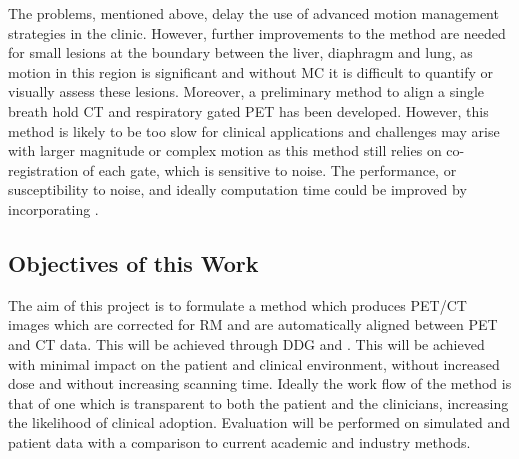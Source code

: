         The problems, mentioned above, delay the use of advanced motion management strategies in the clinic. However, further improvements to the method are needed for small lesions at the boundary between the liver, diaphragm and lung, as motion in this region is significant and without \gls{MC} it is difficult to quantify or visually assess these lesions. Moreover, a preliminary method to align a single breath hold \gls{CT} and respiratory gated \gls{PET} has been developed. However, this method is likely to be too slow for clinical applications and challenges may arise with larger magnitude or complex motion as this method still relies on co-registration of each gate, which is sensitive to noise. The performance, or susceptibility to noise, and ideally computation time could be improved by incorporating . 
            
        \subsection{Objectives of this Work} \label{sec:objectives_of_this_work}
            The aim of this project is to formulate a method which produces \gls{PET}/\gls{CT} images which are corrected for \gls{RM} and are automatically aligned between \gls{PET} and \gls{CT} data. This will be achieved through \gls{DDG} and . %
            This will be achieved with minimal impact on the patient and clinical environment, without increased dose and without increasing scanning time. Ideally the work flow of the method is that of one which is transparent to both the patient and the clinicians, increasing the likelihood of clinical adoption. Evaluation will be performed on simulated and patient data with a comparison to current academic and industry methods.
        
        
